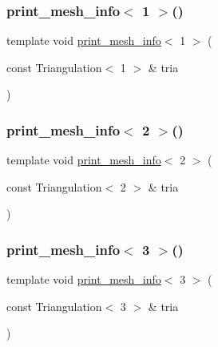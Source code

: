 \subsubsection{\texorpdfstring{print\_mesh\_info$<$ 1 $>$()}{print\_mesh\_info< 1 >()}}
{\footnotesize\ttfamily template void \mbox{\hyperlink{group___supplementary_ga2971a293263dddc17f3df81add2ffbbe}{print\+\_\+mesh\+\_\+info}}$<$ 1 $>$ (\begin{DoxyParamCaption}\item[{const Triangulation$<$ 1 $>$ \&}]{tria }\end{DoxyParamCaption})}

\mbox{\label{supplementary_functions_8cc_a26717733da51a761f009de3a1e57cf15}} 
\subsubsection{\texorpdfstring{print\_mesh\_info$<$ 2 $>$()}{print\_mesh\_info< 2 >()}}
{\footnotesize\ttfamily template void \mbox{\hyperlink{group___supplementary_ga2971a293263dddc17f3df81add2ffbbe}{print\+\_\+mesh\+\_\+info}}$<$ 2 $>$ (\begin{DoxyParamCaption}\item[{const Triangulation$<$ 2 $>$ \&}]{tria }\end{DoxyParamCaption})}

\mbox{\label{supplementary_functions_8cc_a6bd7935769f623c78960b765b08865c2}} 
\subsubsection{\texorpdfstring{print\_mesh\_info$<$ 3 $>$()}{print\_mesh\_info< 3 >()}}
{\footnotesize\ttfamily template void \mbox{\hyperlink{group___supplementary_ga2971a293263dddc17f3df81add2ffbbe}{print\+\_\+mesh\+\_\+info}}$<$ 3 $>$ (\begin{DoxyParamCaption}\item[{const Triangulation$<$ 3 $>$ \&}]{tria }\end{DoxyParamCaption})}

